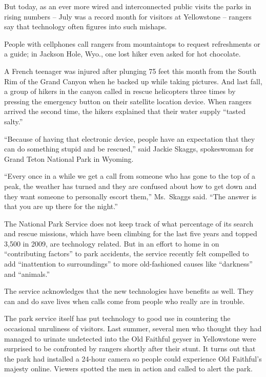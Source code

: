 ﻿\documentclass[12pt]{article}
\begin{document}
But today, as an ever more wired and interconnected public visits the parks in rising numbers --
July was a record month for visitors at Yellowstone -- rangers say that technology often figures
into such mishaps.

People with cellphones call rangers from mountaintops to request refreshments or a guide; in Jackson
Hole, Wyo., one lost hiker even asked for hot chocolate.

A French teenager was injured after plunging 75 feet this month from the South Rim of the Grand
Canyon when he backed up while taking pictures. And last fall, a group of hikers in the canyon
called in rescue helicopters three times by pressing the emergency button on their satellite
location device. When rangers arrived the second time, the hikers explained that their water supply
``tasted salty.''

``Because of having that electronic device, people have an expectation that they can do something
stupid and be rescued,'' said Jackie Skaggs, spokeswoman for Grand Teton National Park in Wyoming.

``Every once in a while we get a call from someone who has gone to the top of a peak, the weather
has turned and they are confused about how to get down and they want someone to personally escort
them,'' Ms.~Skaggs said. ``The answer is that you are up there for the night.''

The National Park Service does not keep track of what percentage of its search and rescue missions,
which have been climbing for the last five years and topped 3,500 in 2009, are technology related.
But in an effort to home in on ``contributing factors'' to park accidents, the service recently felt
compelled to add ``inattention to surroundings'' to more old-fashioned causes like ``darkness'' and
``animals.''

The service acknowledges that the new technologies have benefits as well. They can and do save lives
when calls come from people who really are in trouble.

The park service itself has put technology to good use in countering the occasional unruliness of
visitors. Last summer, several men who thought they had managed to urinate undetected into the Old
Faithful geyser in Yellowstone were surprised to be confronted by rangers shortly after their stunt.
It turns out that the park had installed a 24-hour camera so people could experience Old Faithful's
majesty online. Viewers spotted the men in action and called to alert the park.
\end{document}
